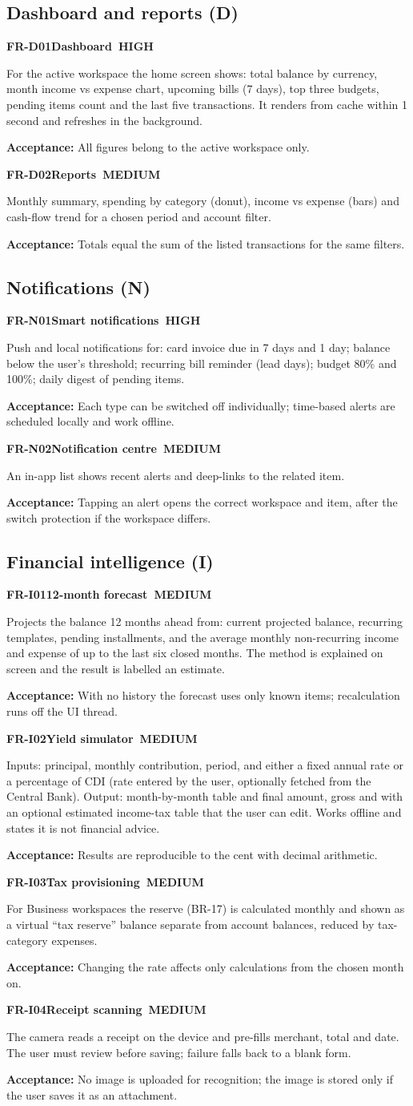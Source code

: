 \documentclass[11pt,a4paper]{article}
\newcommand{\PH}{\colorbox{finlyblue}{\color{white}\scriptsize\bfseries\ HIGH\ }}
\newcommand{\PM}{\colorbox{finlygold}{\color{finlydark}\scriptsize\bfseries\ MEDIUM\ }}
\newcommand{\req}[5]{%
  \begin{tcolorbox}[reqbox]
    {\small\textbf{\textcolor{finlyblue}{#1}}\quad\textbf{#2}\hfill #3}\par\vspace{2pt}
    {\small #4}\par\vspace{2pt}
    {\footnotesize\textcolor{finlytext}{\textbf{Acceptance:} #5}}
  \end{tcolorbox}}
\begin{document}
\subsection{Dashboard and reports (D)}
\req{FR-D01}{Dashboard}{\PH}{For the active workspace the home screen shows: total balance by currency, month income vs expense chart, upcoming bills (7 days), top three budgets, pending items count and the last five transactions. It renders from cache within 1 second and refreshes in the background.}
{All figures belong to the active workspace only.}
\req{FR-D02}{Reports}{\PM}{Monthly summary, spending by category (donut), income vs expense (bars) and cash-flow trend for a chosen period and account filter.}
{Totals equal the sum of the listed transactions for the same filters.}

\subsection{Notifications (N)}
\req{FR-N01}{Smart notifications}{\PH}{Push and local notifications for: card invoice due in 7 days and 1 day; balance below the user's threshold; recurring bill reminder (lead days); budget 80\% and 100\%; daily digest of pending items.}
{Each type can be switched off individually; time-based alerts are scheduled locally and work offline.}
\req{FR-N02}{Notification centre}{\PM}{An in-app list shows recent alerts and deep-links to the related item.}
{Tapping an alert opens the correct workspace and item, after the switch protection if the workspace differs.}

\subsection{Financial intelligence (I)}
\req{FR-I01}{12-month forecast}{\PM}{Projects the balance 12 months ahead from: current projected balance, recurring templates, pending installments, and the average monthly non-recurring income and expense of up to the last six closed months. The method is explained on screen and the result is labelled an estimate.}
{With no history the forecast uses only known items; recalculation runs off the UI thread.}
\req{FR-I02}{Yield simulator}{\PM}{Inputs: principal, monthly contribution, period, and either a fixed annual rate or a percentage of CDI (rate entered by the user, optionally fetched from the Central Bank). Output: month-by-month table and final amount, gross and with an optional estimated income-tax table that the user can edit. Works offline and states it is not financial advice.}
{Results are reproducible to the cent with decimal arithmetic.}
\req{FR-I03}{Tax provisioning}{\PM}{For Business workspaces the reserve (BR-17) is calculated monthly and shown as a virtual ``tax reserve'' balance separate from account balances, reduced by tax-category expenses.}
{Changing the rate affects only calculations from the chosen month on.}
\req{FR-I04}{Receipt scanning}{\PM}{The camera reads a receipt on the device and pre-fills merchant, total and date. The user must review before saving; failure falls back to a blank form.}
{No image is uploaded for recognition; the image is stored only if the user saves it as an attachment.}
\end{document}
